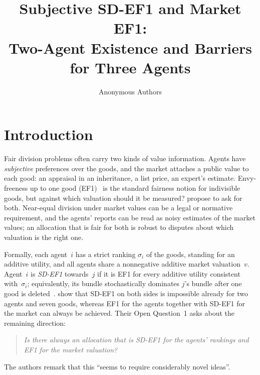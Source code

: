 \documentclass[sigconf,anonymous]{aamas}
\title[Subjective SD-EF1 and Market EF1]{Subjective SD-EF1 and Market EF1:\\Two-Agent Existence and Barriers for Three Agents}
\author{Anonymous Authors}
\affiliation{\institution{Anonymous}\city{Anonymous}\country{Anonymous}}
\begin{document}
\maketitle

\section{Introduction}
Fair division problems often carry two kinds of value information. Agents have \emph{subjective} preferences over the goods, and the market attaches a public value to each good: an appraisal in an inheritance, a list price, an expert's estimate. Envy-freeness up to one good (EF1)~\citep{lipton2004ef1,budish2011} is the standard fairness notion for indivisible goods, but against which valuation should it be measured? \citet{barman2025market} propose to ask for both. Near-equal division under market values can be a legal or normative requirement, and the agents' reports can be read as noisy estimates of the market values; an allocation that is fair for both is robust to disputes about which valuation is the right one.

Formally, each agent~$i$ has a strict ranking $\sigma_i$ of the goods, standing for an additive utility, and all agents share a nonnegative additive market valuation~$v$. Agent~$i$ is \emph{SD-EF1} towards~$j$ if it is EF1 for every additive utility consistent with~$\sigma_i$; equivalently, its bundle stochastically dominates $j$'s bundle after one good is deleted~\citep{aziz2015ordinal}. \citet{barman2025market} show that SD-EF1 on both sides is impossible already for two agents and seven goods, whereas EF1 for the agents together with SD-EF1 for the market can always be achieved. Their Open Question~1 asks about the remaining direction:
\begin{quote}\emph{Is there always an allocation that is SD-EF1 for the agents' rankings and EF1 for the market valuation?}\end{quote}
The authors remark that this ``seems to require considerably novel ideas''.
\end{document}
